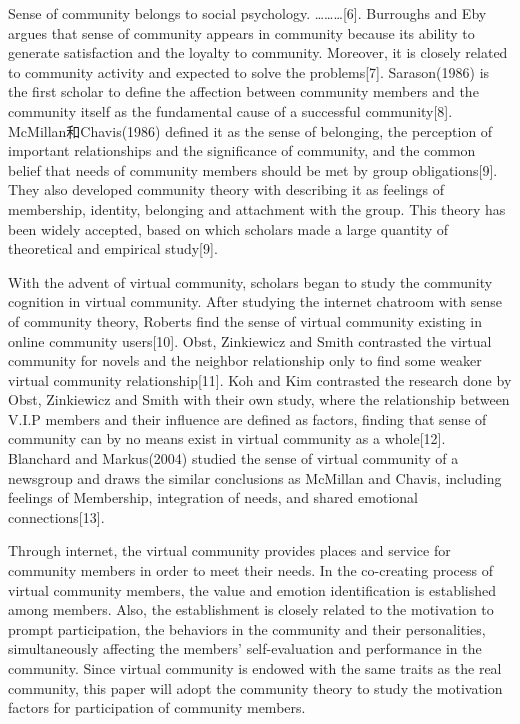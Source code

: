 \documentclass{elsarticle}
\begin{document}
Sense of community belongs to social psychology. ………[6]. Burroughs and Eby argues that sense of community appears in community because its ability to generate satisfaction and the loyalty to community. Moreover, it is closely related to community activity and expected to solve the problems[7]. Sarason(1986) is the first scholar to define the affection between community members and the community itself as the fundamental cause of a successful community[8]. McMillan和Chavis(1986) defined it as the sense of belonging, the perception of important relationships and the significance of community, and the common belief that needs of community members should be met by group obligations[9]. They also developed community theory with describing it as feelings of membership, identity, belonging and attachment with the group. This theory has been widely accepted, based on which scholars made a large quantity of theoretical and empirical study[9]. 

With the advent of virtual community, scholars began to study the community cognition in virtual community. After studying the internet chatroom with sense of community theory, Roberts find the sense of virtual community existing in online community users[10]. Obst, Zinkiewicz and Smith contrasted the virtual community for novels and the neighbor relationship only to find some weaker virtual community relationship[11]. Koh and Kim contrasted the research done by Obst, Zinkiewicz and Smith with their own study, where the relationship between V.I.P members and their influence are defined as factors, finding that sense of community can by no means exist in virtual community as a whole[12]. Blanchard and Markus(2004) studied the sense of virtual community of a newsgroup and draws the similar conclusions as McMillan and Chavis, including feelings of Membership, integration of needs, and shared emotional connections[13]. 

Through internet, the virtual community provides places and service for community members in order to meet their needs. In the co-creating process of virtual community members, the value and emotion identification is established among members. Also, the establishment is closely related to the motivation to prompt participation, the behaviors in the community and their personalities, simultaneously affecting the members’ self-evaluation and performance in the community. Since virtual community is endowed with the same traits as the real community, this paper will adopt the community theory to study the motivation factors for participation of community members. 
\end{document}
